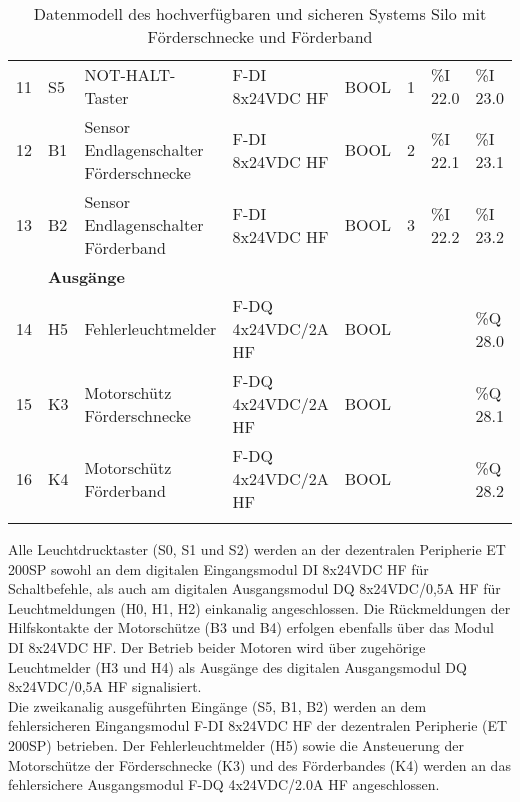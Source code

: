 \begin{table}[H]
\begin{longtable}{|llllllll|}
        \multicolumn{1}{|l|}{11} & \multicolumn{1}{l|}{S5} & \multicolumn{1}{l|}{NOT-HALT-Taster} & \multicolumn{1}{l|}{F-DI 8x24VDC HF} & \multicolumn{1}{l|}{BOOL} & \multicolumn{1}{l|}{1}     & \multicolumn{1}{l|}{\%I 22.0} & \%I 23.0 \\
        \multicolumn{1}{|l|}{12} & \multicolumn{1}{l|}{B1} & \multicolumn{1}{l|}{Sensor Endlagenschalter Förderschnecke} & \multicolumn{1}{l|}{F-DI 8x24VDC HF} & \multicolumn{1}{l|}{BOOL} & \multicolumn{1}{l|}{2} & \multicolumn{1}{l|}{\%I 22.1} & \%I 23.1 \\
        \multicolumn{1}{|l|}{13} & \multicolumn{1}{l|}{B2} & \multicolumn{1}{l|}{Sensor Endlagenschalter Förderband} & \multicolumn{1}{l|}{F-DI 8x24VDC HF} & \multicolumn{1}{l|}{BOOL} & \multicolumn{1}{l|}{3} & \multicolumn{1}{l|}{\%I 22.2} & \%I 23.2 \\ \hline
        \rowcolor{lightGrey}
        & \multicolumn{7}{l|}{\textbf{Ausgänge}} \\ \hline
        \multicolumn{1}{|l|}{14} & \multicolumn{1}{l|}{H5} & \multicolumn{1}{l|}{Fehlerleuchtmelder} & \multicolumn{1}{l|}{F-DQ 4x24VDC/2A HF} & \multicolumn{1}{l|}{BOOL} & \multicolumn{1}{l|}{}      & \multicolumn{1}{l|}{} & \%Q 28.0 \\
        \multicolumn{1}{|l|}{15} & \multicolumn{1}{l|}{K3} & \multicolumn{1}{l|}{Motorschütz Förderschnecke} & \multicolumn{1}{l|}{F-DQ 4x24VDC/2A HF} & \multicolumn{1}{l|}{BOOL} & \multicolumn{1}{l|}{} & \multicolumn{1}{l|}{} & \%Q 28.1 \\
        \multicolumn{1}{|l|}{16} & \multicolumn{1}{l|}{K4} & \multicolumn{1}{l|}{Motorschütz Förderband} & \multicolumn{1}{l|}{F-DQ 4x24VDC/2A HF} & \multicolumn{1}{l|}{BOOL} & \multicolumn{1}{l|}{}      & \multicolumn{1}{l|}{} & \%Q 28.2 \\ \hline
        \caption[Datenmodell des Systems]{Datenmodell des hochverfügbaren und sicheren Systems Silo mit Förderschnecke und Förderband}
        \label{tab:3.1}
    \end{longtable}
\end{table}

Alle Leuchtdrucktaster (S0, S1 und S2) werden an der dezentralen Peripherie ET 200SP sowohl an dem digitalen Eingangsmodul \glqq DI 8x24VDC HF\grqq{} für Schaltbefehle, als auch am digitalen Ausgangsmodul \glqq DQ 8x24VDC/0,5A HF\grqq{} für Leuchtmeldungen (H0, H1, H2) einkanalig angeschlossen. Die Rückmeldungen der Hilfskontakte der Motorschütze (B3 und B4) erfolgen ebenfalls über das Modul \glqq DI 8x24VDC HF\grqq{}. Der Betrieb beider Motoren wird über zugehörige Leuchtmelder (H3 und H4) als Ausgänge des digitalen Ausgangsmodul \glqq DQ 8x24VDC/0,5A HF\grqq{} signalisiert. \\
Die zweikanalig ausgeführten Eingänge (S5, B1, B2) werden an dem fehlersicheren Eingangsmodul \glqq F-DI 8x24VDC HF\grqq{} der dezentralen Peripherie (ET 200SP) betrieben. Der Fehlerleuchtmelder (H5) sowie die Ansteuerung der Motorschütze der Förderschnecke (K3) und des Förderbandes (K4) werden an das fehlersichere Ausgangsmodul \glqq F-DQ 4x24VDC/2.0A HF\grqq{} angeschlossen.